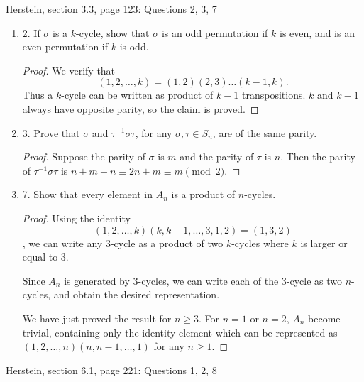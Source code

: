 Herstein, section 3.3, page 123: Questions 2, 3, 7
\begin{enumerate}
	\item 2. If $\sigma$ is a $k$-cycle, show that $\sigma$ is an odd permutation if $k$ is even, and is an even permutation if $k$ is odd.
\begin{proof}
	We verify that \[
		(1,2,\ldots,k) = (1,2)(2,3)\ldots(k-1,k)
	.\] 
	Thus a $k$-cycle can be written as product of $k-1$ transpositions. $k$ and $k-1 $ always have opposite parity, so the claim is proved.
\end{proof}

	\item 3. Prove that $\sigma$ and $\tau^{-1} \sigma \tau$, for any $\sigma, \tau \in S_n$, are of the same parity.
\begin{proof}
	Suppose the parity of $\sigma$ is $m$ and the parity of $\tau$ is $n$. Then the parity of $\tau^{-1} \sigma\tau$ is $n + m + n \equiv 2 n + m \equiv m \pmod 2$.
\end{proof}

	\item 7. Show that every element in $A_n$ is a product of $n$-cycles.
\begin{proof}
	Using the identity
	\[
		(1,2,\ldots, k)(k, k-1, \ldots, 3, 1,2) = (1,3,2)
	\] 
	, we can write any $3$-cycle as a product of two $k$-cycles where $k$ is larger or equal to $3$. 

	Since $A_n$ is generated by $3$-cycles, we can write each of the $3$-cycle as two $n$-cycles, and obtain the desired representation.

	 We have just proved the result for $n \ge 3$. For $n = 1$ or $n=2$, $A_n$ become trivial, containing only the identity element which can be represented as $(1,2,\ldots,n)(n,n-1,\ldots,1)$ for any $n \ge 1$.
\end{proof}

\end{enumerate}
Herstein, section 6.1, page 221: Questions 1, 2, 8
